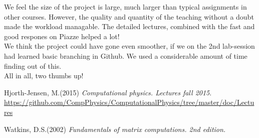 \documentclass{article}
\begin{document}
We feel the size of the project is large, much larger than typical assignments in other courses. However, the quality and quantity of the teaching without a doubt made the workload managable. The detailed lectures, combined with the fast and good respones on Piazze helped a lot!\\

We think the project could have gone even smoother, if we on the 2nd lab-session had learned basic branching in Github. We used a considerable amount of time finding out of this.\\

All in all, two thumbs up!

\pagebreak
\begin{thebibliography}{9}
	Hjorth-Jensen, M.(2015)
	\textit{Computational physics. Lectures fall 2015}. 
	\url{https://github.com/CompPhysics/ComputationalPhysics/tree/master/doc/Lectures}
	
	Watkins, D.S.(2002)
	\textit{Fundamentals of matrix computations. 2nd edition.}

\end{thebibliography}
\end{document}
